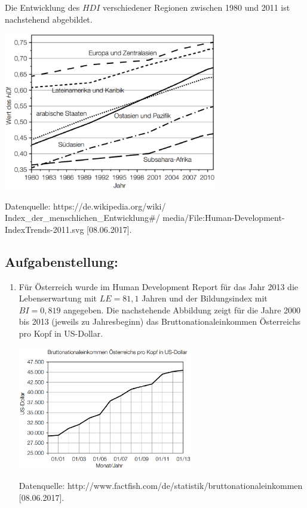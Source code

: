 \begin{langesbeispiel}
Die Entwicklung des $HDI$ verschiedener Regionen zwischen 1980 und 2011 ist nachstehend abgebildet.

\begin{center}
\includegraphics[width=0.7\textwidth]{../Bilder/Bild86-1.eps}
\end{center}
\begin{singlespace}
\tiny Datenquelle: https://de.wikipedia.org/wiki/
Index\_der\_menschlichen\_Entwicklung\#/
media/File:Human-Development-IndexTrends-2011.svg
[08.06.2017]. \normalsize
\end{singlespace}

\subsection{Aufgabenstellung:}

\begin{enumerate}
	\item Für Österreich wurde im Human Development Report für das Jahr 2013 die Lebenserwartung mit $LE = 81,1$ Jahren und der Bildungsindex mit $BI = 0,819$ angegeben. Die nachstehende Abbildung zeigt für die Jahre 2000 bis 2013 (jeweils zu Jahresbeginn) das Bruttonationaleinkommen Österreichs pro Kopf in US-Dollar.
	
\begin{center}
\includegraphics[width=0.6\textwidth]{../Bilder/Bild86-2.eps}
\end{center}	
\tiny Datenquelle: http://www.factfish.com/de/statistik/bruttonationaleinkommen [08.06.2017]. \normalsize


\end{enumerate}
\end{langesbeispiel}
